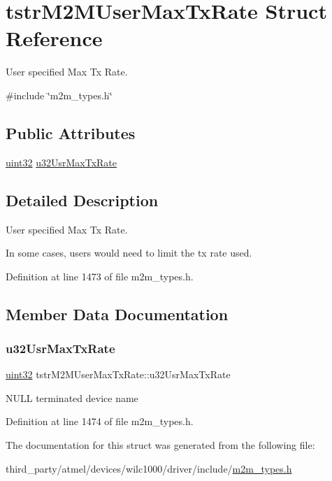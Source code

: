 \hypertarget{structtstrM2MUserMaxTxRate}{}\section{tstr\+M2\+M\+User\+Max\+Tx\+Rate Struct Reference}
\label{structtstrM2MUserMaxTxRate}


User specified Max Tx Rate.  




{\ttfamily \#include \char`\"{}m2m\+\_\+types.\+h\char`\"{}}

\subsection*{Public Attributes}
\begin{DoxyCompactItemize}
\item 
\hyperlink{group__DataT_ga100e7c691a47d6978527c479a0158245}{uint32} \hyperlink{structtstrM2MUserMaxTxRate_a457c1541ebf71a14e3267c8549e6f10c}{u32\+Usr\+Max\+Tx\+Rate}
\end{DoxyCompactItemize}


\subsection{Detailed Description}
User specified Max Tx Rate. 

In some cases, users would need to limit the tx rate used. 

Definition at line 1473 of file m2m\+\_\+types.\+h.



\subsection{Member Data Documentation}
\mbox{\label{structtstrM2MUserMaxTxRate_a457c1541ebf71a14e3267c8549e6f10c}} 
\subsubsection{\texorpdfstring{u32\+Usr\+Max\+Tx\+Rate}{u32UsrMaxTxRate}}
{\footnotesize\ttfamily \hyperlink{group__DataT_ga100e7c691a47d6978527c479a0158245}{uint32} tstr\+M2\+M\+User\+Max\+Tx\+Rate\+::u32\+Usr\+Max\+Tx\+Rate}

N\+U\+LL terminated device name 

Definition at line 1474 of file m2m\+\_\+types.\+h.



The documentation for this struct was generated from the following file\+:\begin{DoxyCompactItemize}
\item 
third\+\_\+party/atmel/devices/wilc1000/driver/include/\hyperlink{m2m__types_8h}{m2m\+\_\+types.\+h}\end{DoxyCompactItemize}
